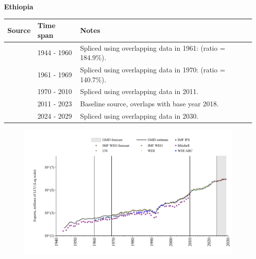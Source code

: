 \documentclass[12pt,a4paper,landscape]{article}
\begin{document}
\begin{adjustbox}{max totalsize={\paperwidth}{\paperheight},center}
\begin{minipage}[t][\textheight][t]{\textwidth}
\vspace*{0.5cm}
{}
\begin{center}
{\Large\bfseries Ethiopia}
\end{center}
\vspace{0.5cm}
\begin{table}[H]
\centering
\small
\begin{tabular}{|l|l|l|}
\hline
\textbf{Source} & \textbf{Time span} & \textbf{Notes} \\
\hline
\rowcolor{white}\cite{Mitchell}& 1944 - 1960 &Spliced using overlapping data in 1961: (ratio = 184.9\%).\\
\rowcolor{lightgray}\cite{IMF_IFS}& 1961 - 1969 &Spliced using overlapping data in 1970: (ratio = 140.7\%).\\
\rowcolor{white}\cite{UN}& 1970 - 2010 &Spliced using overlapping data in 2011.\\
\rowcolor{lightgray}\cite{WDI}& 2011 - 2023 &Baseline source, overlaps with base year 2018.\\
\rowcolor{white}\cite{IMF_WEO_forecast}& 2024 - 2029 &Spliced using overlapping data in 2030.\\
\hline
\end{tabular}
\end{table}
\begin{figure}[H]
\centering
\includegraphics[width=\textwidth,height=0.6\textheight,keepaspectratio]{graphs/ETH_exports.pdf}
\end{figure}
\end{minipage}
\end{adjustbox}
\end{document}
